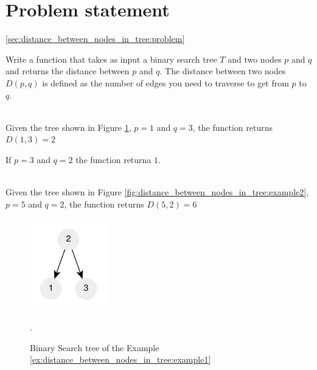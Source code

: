 \section{Problem statement}
\ref{sec:distance_between_nodes_in_tree:problem}
\begin{exercise}
	Write a function that takes as input a binary search tree $T$ and two nodes $p$ and $q$ and returns the distance between $p$ and $q$.
	The distance between two nodes $D(p,q)$ is defined as the number of edges you need to traverse to get from $p$ to $q$.
	
	\begin{example}
		\hfill \\
		Given the tree shown in Figure \ref{fig:distance_between_nodes_in_tree:example1}, 
		$p = 1$ and $q=3$, the function returns $D(1,3)=2$ 
		
		If $p=3$ and $q=2$ the function returna $1$.
	\label{ex:distance_between_nodes_in_tree:example1}
	\end{example}

	\begin{example}
		\hfill \\
		Given the tree shown in Figure \ref{fig:distance_between_nodes_in_tree:example2}, 
		$p = 5$ and $q=2$, the function returns $D(5,2)=6$ 
		\label{ex:distance_between_nodes_in_tree:example2}
	\end{example}
\end{exercise}

\begin{figure}
	\centering
	\includegraphics[width=0.3\textwidth]{sources/distance_between_nodes_in_tree/images/example1}
	\caption{Binary Search tree of the Example
	\ref{ex:distance_between_nodes_in_tree:example1}}.
	\label{fig:distance_between_nodes_in_tree:example1}
\end{figure}


